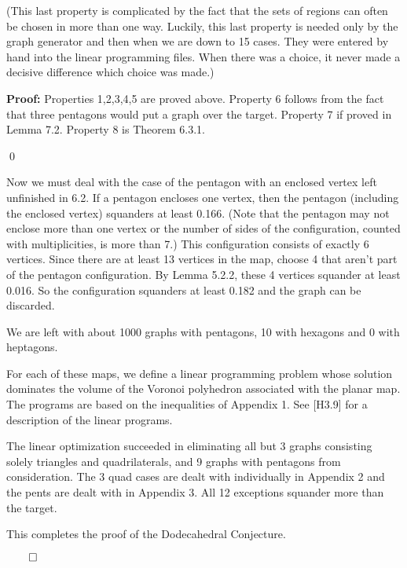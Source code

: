 \smallskip
(This last property is complicated by the fact that the sets of regions can often be chosen in more than one way.  
Luckily, this last property is needed only by the graph generator and then
when we are down to 15 cases.  They were entered by hand into the linear programming files.  When there was a choice, it never made a decisive difference which choice was made.) \newline

\bigskip

{\bf Proof:} Properties 1,2,3,4,5 are proved above.
Property 6 follows from the fact that three pentagons would put 
a graph over the target.
Property 7 if proved in Lemma 7.2.
Property 8 is Theorem 6.3.1.

\qed




Now we must deal with the case of the pentagon with an enclosed vertex left unfinished in 6.2.  
If a pentagon encloses one vertex, then the pentagon (including the enclosed vertex) squanders at least 0.166.  (Note that the pentagon may not enclose more than one vertex or the number of sides of the configuration, counted with multiplicities, is more than 7.)  This configuration consists of exactly 6 vertices.  Since there are at least 13 vertices in the map, choose 4 that aren't part of the pentagon configuration.  By Lemma 5.2.2, these 4 vertices squander at least 0.016.  So the configuration squanders at least 0.182 and the graph can be discarded.  

We are left with about 1000 graphs with pentagons, 10 with hexagons and 0 with heptagons.


For each of these maps, we define a linear programming problem whose solution dominates the volume of the Voronoi polyhedron associated with the planar map.  
The programs are based on the inequalities of Appendix 1.
See [H3.9] for a description of the linear programs.

The linear optimization succeeded in eliminating all but 3 graphs consisting 
solely triangles and quadrilaterals, and 9 graphs with pentagons from consideration.  The  3 quad cases are dealt with individually in Appendix 2 and the pents are dealt with in Appendix 3.  All 12 exceptions squander more than the target.  


\bigskip


This completes the proof of the Dodecahedral Conjecture.

$\qed$

\bigskip




